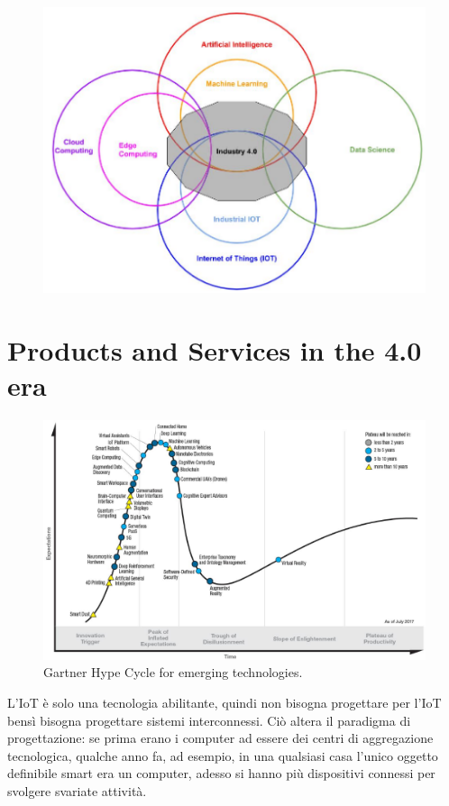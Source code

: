 \documentclass[a4paper,11pt,oneside]{book}
\begin{document}
\begin{figure}[!h]
	\centering
	\includegraphics[scale=0.55]{immagini/Holistic.png}
\end{figure}

\pagebreak

\section{Products and Services in the 4.0 era}

\begin{figure}[!h]
	\centering
	\includegraphics[scale=0.45]{immagini/Hype.png}
	\caption{Gartner Hype Cycle for emerging technologies.}
\end{figure}

L'IoT è solo una tecnologia abilitante, quindi non bisogna progettare per l'IoT bensì bisogna progettare sistemi interconnessi. Ciò altera il paradigma di progettazione: se prima erano i computer ad essere dei centri di aggregazione tecnologica, qualche anno fa, ad esempio, in una qualsiasi casa l'unico oggetto definibile smart era un computer, adesso si hanno più dispositivi connessi per svolgere svariate attività.
\end{document}
